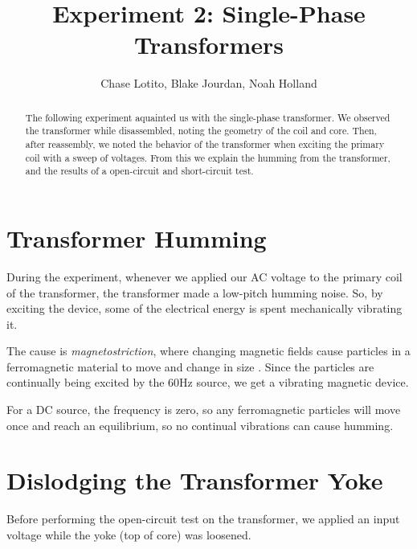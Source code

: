 \documentclass{IEEEtran}
\title{Experiment 2: Single-Phase Transformers}
\author{Chase Lotito, Blake Jourdan, Noah Holland}
\date{}
\begin{document}
\pagestyle{fancy}

\fancyhf{}

\maketitle

\begin{abstract}
    The following experiment aquainted us with the single-phase transformer. We observed the transformer while disassembled, noting the geometry of the coil and core. Then, after reassembly, we noted the behavior of the transformer when exciting the primary coil with a sweep of voltages. From this we explain the humming from the transformer, and the results of a open-circuit and short-circuit test.
\end{abstract}

\section{Transformer Humming}

During the experiment, whenever we applied our AC voltage to the primary coil of the transformer, the transformer made a low-pitch humming noise. So, by exciting the device, some of the electrical energy is spent mechanically vibrating it.

The cause is \emph{magnetostriction}, where changing magnetic fields cause particles in a ferromagnetic material to move and change in size \cite{magnetostriction}. Since the particles are continually being excited by the 60Hz source, we get a vibrating magnetic device.

For a DC source, the frequency is zero, so any ferromagnetic particles will move once and reach an equilibrium, so no continual vibrations can cause humming.

\section{Dislodging the Transformer Yoke}

Before performing the open-circuit test on the transformer, we applied an input voltage while the yoke (top of core) was loosened.


\end{document}
